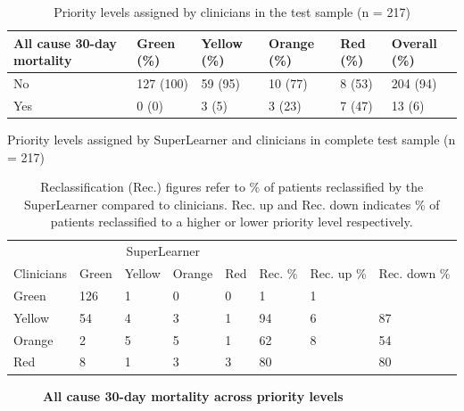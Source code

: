 \documentclass[10pt,letterpaper]{article}\usepackage[]{graphicx}\usepackage[]{color}
\begin{document}
\begin{table}[!ht]
\centering
\caption{Priority levels assigned by clinicians in the test sample (n = 217)} 
\label{tab:clinicians_priorities_test}
\begin{tabular}{llllll}
  \hline
All cause 30-day mortality & Green (\%) & Yellow (\%) & Orange (\%) & Red (\%) & Overall (\%) \\ 
  \hline
No & 127 (100) & 59 (95) & 10 (77) & 8 (53) & 204 (94) \\ 
  Yes & 0 (0) & 3 (5) & 3 (23) & 7 (47) & 13 (6) \\ 
   \hline
\end{tabular}
\end{table}


\begin{table}[!ht]
\centering
\caption{Priority levels assigned by SuperLearner and clinicians in complete test sample (n = 217)} 
\label{tab:reclass_all}
\begin{tabular}{llllllll}
  \hline
  & \multicolumn{4}{c}{SuperLearner} \\
 Clinicians & Green & Yellow & Orange & Red & Rec. \% & Rec. up \% & Rec. down \% \\
 \hline
Green & 126 & 1 & 0 & 0 & 1 & 1 &  \\ 
  Yellow & 54 & 4 & 3 & 1 & 94 & 6 & 87 \\ 
  Orange & 2 & 5 & 5 & 1 & 62 & 8 & 54 \\ 
  Red & 8 & 1 & 3 & 3 & 80 &  & 80 \\ 
   \hline
\end{tabular}
\caption*{Reclassification (Rec.) figures refer to \% of patients reclassified by the SuperLearner compared to clinicians. Rec. up and Rec. down indicates \% of patients reclassified to a higher or lower priority level respectively.} 
\end{table}


\begin{figure}[!h]
  \caption{\bf All cause 30-day mortality across priority levels}
  \label{fig:mortality_plot}
\end{figure}
\end{document}
